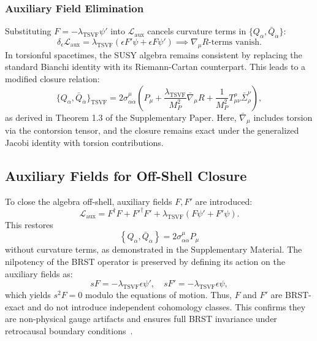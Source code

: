 \documentclass[twocolumn,superscriptaddress,floatfix]{revtex4-2}
\begin{document}
\subsubsection{Auxiliary Field Elimination}  
Substituting $F = -\lambda_{\text{TSVF}} \psi'$ into $\mathcal{L}_{\text{aux}}$ cancels curvature terms in $\{Q_\alpha, \bar{Q}_{\dot{\alpha}}\}$:  
\begin{equation}  
\delta_{\epsilon} \mathcal{L}_{\text{aux}} = \lambda_{\text{TSVF}} \left( \epsilon F' \psi + \epsilon F \psi' \right) \implies \nabla_\mu R \text{-terms vanish}.  
\label{eq:aux_terms_vanish}
\end{equation}
In torsionful spacetimes, the SUSY algebra remains consistent by replacing the standard Bianchi identity with its Riemann-Cartan counterpart. This leads to a modified closure relation:
\[
\{Q_\alpha, \bar{Q}_{\dot{\alpha}}\}_{\text{TSVF}} = 2 \sigma^\mu_{\alpha \dot{\alpha}} \left( P_\mu + \frac{\lambda_{\text{TSVF}}}{M_P^2} \bar{\nabla}_\mu R + \frac{1}{M_P^2} T^\rho_{\mu\nu} \bar{\Sigma}^\nu_\rho \right),
\]
as derived in Theorem 1.3 of the Supplementary Paper. Here, $\bar{\nabla}_\mu$ includes torsion via the contorsion tensor, and the closure remains exact under the generalized Jacobi identity with torsion contributions.



\subsection{Auxiliary Fields for Off-Shell Closure}  
\label{subsec:auxiliary}    

To close the algebra off-shell, auxiliary fields $F, F'$ are introduced:  
\begin{equation}  
\mathcal{L}_{\text{aux}} = F^\dagger F + F'^\dagger F' + \lambda_{\text{TSVF}}(F\psi' + F'\psi).  
\label{eq:auxiliary}   
\end{equation}  
This restores  
\[
\left\{ Q_{\alpha}, \bar{Q}_{\dot{\alpha}} \right\} = 2\sigma^{\mu}_{\alpha\dot{\alpha}}P_{\mu}
\]
without curvature terms, as demonstrated in the Supplementary Material.
The nilpotency of the BRST operator is preserved by defining its action on the auxiliary fields as:
\[
sF = -\lambda_{\text{TSVF}} \epsilon \psi', \quad sF' = -\lambda_{\text{TSVF}} \epsilon \psi,
\]
which yields $s^2 F = 0$ modulo the equations of motion. Thus, $F$ and $F'$ are BRST-exact and do not introduce independent cohomology classes. This confirms they are non-physical gauge artifacts and ensures full BRST invariance under retrocausal boundary conditions~\cite{Henneaux1992}.
\end{document}
